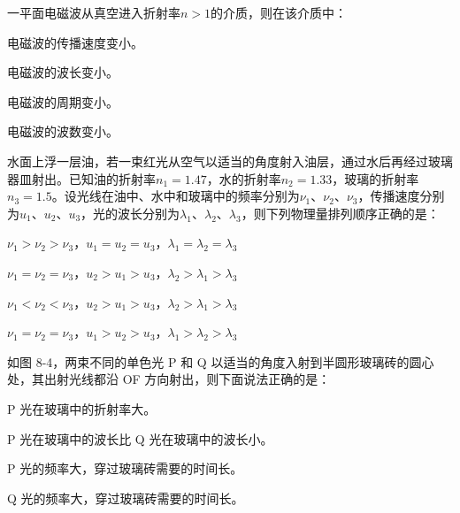 \documentclass[padl, analysis, notocnum]{ExBook}
\newcommand{\answerarea}[1][3.5cm]{%
  \par\vspace{1mm}%
  \noindent{\color{themeColor!35}\rule{\linewidth}{0.4pt}}\par
  \noindent\begin{minipage}[t][#1][t]{\linewidth}\vspace{0pt}\end{minipage}\par
  \noindent{\color{themeColor!35}\rule{\linewidth}{0.4pt}}\par
}
\begin{document}
\begin{qitems}[startnum=2]
\qitem 一平面电磁波从真空进入折射率$n>1$的介质，则在该介质中：
\par\noindent\hspace{2em}电磁波的传播速度变小。
\par\noindent\hspace{2em}电磁波的波长变小。
\par\noindent\hspace{2em}电磁波的周期变小。
\par\noindent\hspace{2em}电磁波的波数变小。
\label{q:175:start}
\answerarea[4.0cm]
\label{q:175:end}
\end{qitems}

\begin{qitems}[startnum=3]
\qitem 水面上浮一层油，若一束红光从空气以适当的角度射入油层，通过水后再经过玻璃器皿射出。已知油的折射率$n_{1}=1.47$，水的折射率$n_{2}=1.33$，玻璃的折射率$n_{3}=1.5$。设光线在油中、水中和玻璃中的频率分别为$\nu_{1}$、$\nu_{2}$、$\nu_{3}$，传播速度分别为$u_{1}$、$u_{2}$、$u_{3}$，光的波长分别为$\lambda_{1}$、$\lambda_{2}$、$\lambda_{3}$，则下列物理量排列顺序正确的是：
\par\noindent\hspace{2em}$\nu_{1}>\nu_{2}>\nu_{3}$，$u_{1}=u_{2}=u_{3}$，$\lambda_{1}=\lambda_{2}=\lambda_{3}$
\par\noindent\hspace{2em}$\nu_{1}=\nu_{2}=\nu_{3}$，$u_{2}>u_{1}>u_{3}$，$\lambda_{2}>\lambda_{1}>\lambda_{3}$
\par\noindent\hspace{2em}$\nu_{1}<\nu_{2}<\nu_{3}$，$u_{2}>u_{1}>u_{3}$，$\lambda_{2}>\lambda_{1}>\lambda_{3}$
\par\noindent\hspace{2em}$\nu_{1}=\nu_{2}=\nu_{3}$，$u_{1}>u_{2}>u_{3}$，$\lambda_{1}>\lambda_{2}>\lambda_{3}$
\label{q:176:start}
\answerarea[4.0cm]
\label{q:176:end}
\end{qitems}

\begin{qitems}[startnum=4]
\qitem 如图 8-4，两束不同的单色光 P 和 Q 以适当的角度入射到半圆形玻璃砖的圆心处，其出射光线都沿 OF 方向射出，则下面说法正确的是：
\par\noindent\hspace{2em}P 光在玻璃中的折射率大。
\par\noindent\hspace{2em}P 光在玻璃中的波长比 Q 光在玻璃中的波长小。
\par\noindent\hspace{2em}P 光的频率大，穿过玻璃砖需要的时间长。
\par\noindent\hspace{2em}Q 光的频率大，穿过玻璃砖需要的时间长。
\label{q:177:start}
\answerarea[1.6cm]
\label{q:177:end}
\end{qitems}
\end{document}
